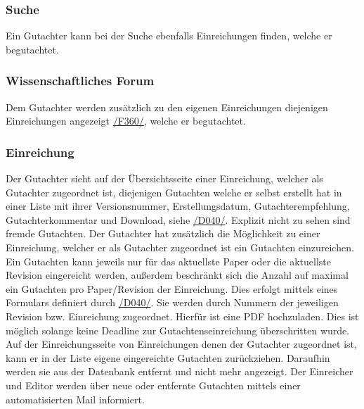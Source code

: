 \subsubsection{Suche}
\begin{description}
     Ein Gutachter kann bei der Suche ebenfalls Einreichungen finden, welche er begutachtet.
\end{description}

\subsubsection{Wissenschaftliches Forum}
\begin{description}
     Dem Gutachter werden zusätzlich zu den eigenen Einreichungen diejenigen Einreichungen angezeigt
    \hyperref[funkt:360]{/F360/}, welche er begutachtet.
\end{description}

\subsubsection{Einreichung} \label{gut:ein}
\begin{description}
     Der Gutachter sieht auf der Übersichtsseite einer Einreichung, welcher als Gutachter
    zugeordnet ist, diejenigen Gutachten welche er selbst erstellt hat in einer
    Liste mit ihrer Versionsnummer, Erstellungsdatum, Gutachterempfehlung, Gutachterkommentar und Download,
    siehe \hyperref[d040]{/D040/}. Explizit nicht zu sehen sind fremde Gutachten.
     Der Gutachter hat zusätzlich die Möglichkeit zu einer Einreichung, welcher er als Gutachter
    zugeordnet ist ein Gutachten einzureichen. Ein Gutachten kann jeweils nur für das aktuellste Paper oder die aktuellste Revision
    eingereicht werden, außerdem beschränkt sich die Anzahl auf maximal ein Gutachten pro Paper/Revision der Einreichung.
    Dies erfolgt mittels eines Formulars definiert durch \hyperref[d040]{/D040/}.
    Sie werden durch Nummern der jeweiligen Revision bzw. Einreichung zugeordnet.
    Hierfür ist eine PDF hochzuladen. Dies ist möglich solange keine Deadline zur Gutachtenseinreichung überschritten wurde.
     Auf der Einreichungsseite von Einreichungen denen der Gutachter zugeordnet ist,
    kann er in der Liste eigene eingereichte Gutachten zurückziehen.
    Daraufhin werden sie aus der Datenbank entfernt und nicht mehr angezeigt.
     Der Einreicher und Editor werden über neue oder entfernte Gutachten mittels einer automatisierten
    Mail informiert.
\end{description}

